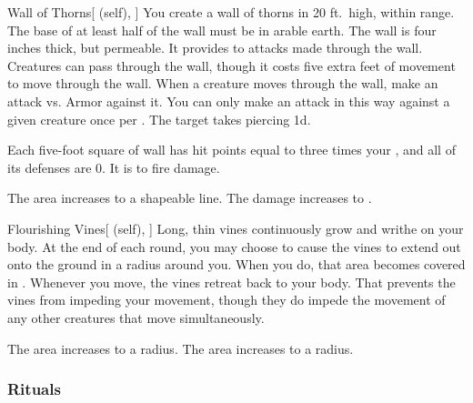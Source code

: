 \lowercase{\hypertarget{spell:Wall of Thorns}{}}\label{spell:Wall of Thorns}
\begin{attuneability}[Rank 3]{\hypertarget{spell:Wall of Thorns}{Wall of Thorns}}[ (self), ]
You create a wall of thorns in 20 ft.\ high, \areamed {} within \rngmed range.
The base of at least half of the wall must be in arable earth.
The wall is four inches thick, but permeable.
It provides  to attacks made through the wall.
Creatures can pass through the wall, though it costs five extra feet of movement to move through the wall.
When a creature moves through the wall, make an attack vs. Armor against it.
You can only make an attack in this way against a given creature once per .
\hit The target takes piercing  \minus1d.

Each five-foot square of wall has hit points equal to three times your , and all of its defenses are 0.
It is  to fire damage.

\rankline
{} The area increases to a \arealarge shapeable line.
 The damage increases to .
\end{attuneability}
\vspace{0.25em}



\lowercase{\hypertarget{spell:Flourishing Vines}{}}\label{spell:Flourishing Vines}
\begin{attuneability}[Rank 4]{\hypertarget{spell:Flourishing Vines}{Flourishing Vines}}[ (self), ]
Long, thin vines continuously grow and writhe on your body.
At the end of each round, you may choose to cause the vines to extend out onto the ground in a \areamed radius around you.
When you do, that area becomes covered in .
Whenever you move, the vines retreat back to your body.
That prevents the vines from impeding your movement, though they do impede the movement of any other creatures that move simultaneously.

\rankline
{} The area increases to a \arealarge radius.
 The area increases to a \areahuge radius.
\end{attuneability}
\vspace{0.25em}



\subsubsection{Rituals}


